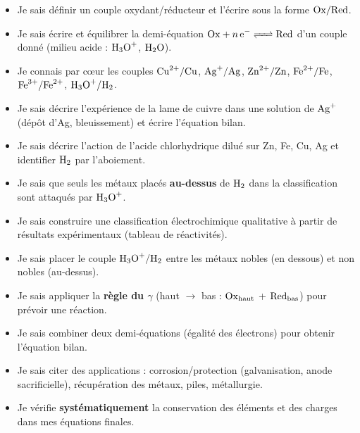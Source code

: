 \documentclass[11pt]{article}
\begin{document}
\begin{aretenir}
\begin{itemize}
  \item[$\square$] Je sais définir un couple oxydant/réducteur et l'écrire sous la forme $\ce{Ox/Red}$.
  \item[$\square$] Je sais écrire et équilibrer la demi-équation $\ce{Ox + n e- <=> Red}$ d'un couple donné (milieu acide : $\ce{H3O+}$, $\ce{H2O}$).
  \item[$\square$] Je connais par cœur les couples $\ce{Cu^2+}/\ce{Cu}$, $\ce{Ag+}/\ce{Ag}$, $\ce{Zn^2+}/\ce{Zn}$, $\ce{Fe^2+}/\ce{Fe}$, $\ce{Fe^3+}/\ce{Fe^2+}$, $\ce{H3O+}/\ce{H2}$.
  \item[$\square$] Je sais décrire l'expérience de la lame de cuivre dans une solution de $\ce{Ag+}$ (dépôt d'Ag, bleuissement) et écrire l'équation bilan.
  \item[$\square$] Je sais décrire l'action de l'acide chlorhydrique dilué sur Zn, Fe, Cu, Ag et identifier $\ce{H2}$ par l'aboiement.
  \item[$\square$] Je sais que seuls les métaux placés \textbf{au-dessus} de $\ce{H2}$ dans la classification sont attaqués par $\ce{H3O+}$.
  \item[$\square$] Je sais construire une classification électrochimique qualitative à partir de résultats expérimentaux (tableau de réactivités).
  \item[$\square$] Je sais placer le couple $\ce{H3O+}/\ce{H2}$ entre les métaux nobles (en dessous) et non nobles (au-dessus).
  \item[$\square$] Je sais appliquer la \textbf{règle du $\gamma$} (haut $\to$ bas : $\ce{Ox_{haut}}$ + $\ce{Red_{bas}}$) pour prévoir une réaction.
  \item[$\square$] Je sais combiner deux demi-équations (égalité des électrons) pour obtenir l'équation bilan.
  \item[$\square$] Je sais citer des applications : corrosion/protection (galvanisation, anode sacrificielle), récupération des métaux, piles, métallurgie.
  \item[$\square$] Je vérifie \textbf{systématiquement} la conservation des éléments et des charges dans mes équations finales.
\end{itemize}
\end{aretenir}
\end{document}

